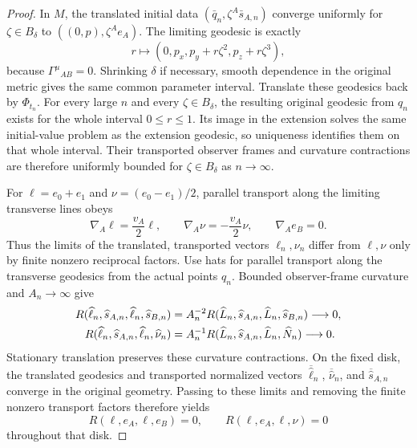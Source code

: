\documentclass[10pt]{article}
\begin{document}
\begin{proof}
In \(M\), the translated initial data
\((\bar q_n,\zeta^A\bar s_{A,n})\) converge uniformly for
\(\zeta\in B_\delta\) to \(((0,p),\zeta^Ae_A)\).  The limiting geodesic is exactly
\begin{equation}
  r\longmapsto (0,p_x,p_y+r\zeta^2,p_z+r\zeta^3),
  \label{eq:limiting-transverse-geodesic}
\end{equation}
because \(\Gamma^\mu{}_{AB}=0\).  Shrinking \(\delta\) if necessary, smooth
dependence in the original metric gives the same common parameter interval.
Translate these geodesics back by \(\Phi_{t_n}\).  For every large
\(n\) and every \(\zeta\in B_\delta\), the resulting original geodesic
from \(q_n\) exists for the whole interval \(0\leq r\leq1\).  Its image in
the extension solves the same initial-value problem as the extension geodesic,
so uniqueness identifies them on that whole interval.  Their transported
observer frames and curvature contractions are therefore uniformly bounded
for \(\zeta\in B_\delta\) as \(n\to\infty\).

For \(\ell=e_0+e_1\) and \(\nu=(e_0-e_1)/2\), parallel transport along
the limiting transverse lines obeys
\begin{equation}
  \nabla_A\ell=\frac{v_A}{2}\ell,
  \qquad
  \nabla_A\nu=-\frac{v_A}{2}\nu,
  \qquad
  \nabla_Ae_B=0.
  \label{eq:transverse-null-transport}
\end{equation}
Thus the limits of the translated, transported vectors
\(\ell_n,\nu_n\) differ from \(\ell,\nu\) only by finite nonzero
reciprocal factors.  Use hats for parallel transport along the transverse
geodesics from the actual points \(q_n\).
Bounded observer-frame curvature and \(A_n\to\infty\) give
\begin{align}
 R(\widehat\ell_n,\widehat s_{A,n},\widehat\ell_n,\widehat s_{B,n})
 &=A_n^{-2}R(\widehat L_n,\widehat s_{A,n},\widehat L_n,\widehat s_{B,n})
 \longrightarrow0, \notag\\
 R(\widehat\ell_n,\widehat s_{A,n},\widehat\ell_n,\widehat\nu_n)
 &=A_n^{-1}R(\widehat L_n,\widehat s_{A,n},\widehat L_n,\widehat N_n)
 \longrightarrow0.
 \label{eq:scaled-curvature-limits}
\end{align}
Stationary translation preserves these curvature contractions.  On the
fixed disk, the translated geodesics and transported normalized vectors
\(\overline{\widehat\ell}_n\), \(\overline{\widehat\nu}_n\), and
\(\overline{\widehat s}_{A,n}\) converge in the original geometry.
Passing to these limits and removing the finite nonzero transport factors
therefore yields
\begin{equation}
  R(\ell,e_A,\ell,e_B)=0,
  \qquad
  R(\ell,e_A,\ell,\nu)=0
  \label{eq:positive-boost-vanishing}
\end{equation}
throughout that disk.


\end{proof}
\end{document}
